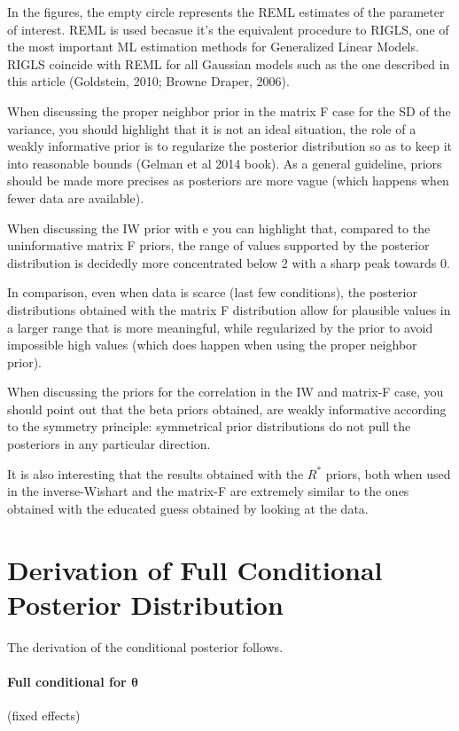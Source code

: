 \documentclass[a4paper]{article}
\begin{document}
In the figures, the empty circle represents the REML estimates
of the parameter of interest. REML is used becasue it's the
equivalent procedure to RIGLS, one of the most important ML
estimation methods for Generalized Linear Models. RIGLS coincide 
with REML for all Gaussian models such as the one described 
in this article (Goldstein, 2010; Browne Draper, 2006).

When discussing the proper neighbor prior in the matrix F case
for the SD of the variance, you should highlight that it is 
not an ideal situation, the role of a weakly informative prior
is to regularize the posterior distribution so as to keep it into
reasonable bounds (Gelman et al 2014 book). As a general guideline,
priors should be made more precises as posteriors are more vague
(which happens when fewer data are available).

When discussing the IW prior with e you can highlight that, 
compared to the uninformative matrix F priors, the range of 
values supported by the posterior distribution is decidedly  
more concentrated below 2 with a sharp peak towards 0.

In comparison, even when data is scarce (last few conditions),  
the posterior distributions obtained with the matrix F distribution
allow for plausible values in a larger range that is more 
meaningful, while regularized by the prior to avoid impossible
high values (which does happen when using the proper neighbor 
prior).

When discussing the priors for the correlation in the IW and
matrix-F case, you should point out that the beta priors obtained,
are weakly informative according to the symmetry principle: 
symmetrical prior distributions do not pull the posteriors in
any particular direction.

It is also interesting that the results obtained with the $R^*$
priors, both when used in the inverse-Wishart and the matrix-F
are extremely similar to the ones obtained with the educated 
guess obtained by looking at the data.

\section*{Derivation of Full Conditional Posterior Distribution}

The derivation of the conditional posterior follows.

\paragraph{Full conditional for $\bm{\theta}$}(fixed effects) \\
\end{document}
